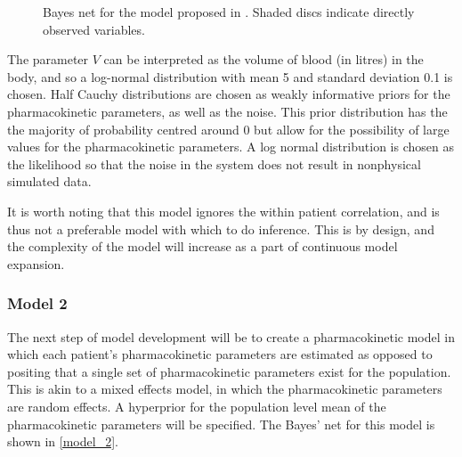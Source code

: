 \begin{figure}[t!]
	
	\centering
	\caption[Bayes net for first pharmacokinetic model]{Bayes net for the model proposed in .  Shaded discs indicate directly observed variables.}
	\label{model_1}
\end{figure}

The parameter $V$ can be interpreted as the volume of blood (in litres) in the body, and so a log-normal distribution with mean 5 and standard deviation 0.1 is chosen.  Half Cauchy distributions are chosen as weakly informative priors for the pharmacokinetic parameters, as well as the noise. This prior distribution has the the majority of probability centred around 0 but allow for the possibility of large values for the pharmacokinetic parameters.  A log normal distribution is chosen as the likelihood so that the noise in the system does not result in nonphysical simulated data.

It is worth noting that this model ignores the within patient correlation, and is thus not a preferable model with which to do inference.  This is by design, and the complexity of the model will increase as a part of continuous model expansion. 

\subsubsection{Model 2}

The next step of model development will be to create a  pharmacokinetic model in which each patient's pharmacokinetic parameters are estimated as opposed to positing that a single set of pharmacokinetic parameters exist for the population. This is akin to a mixed effects model, in which the pharmacokinetic parameters are random effects.  A hyperprior for the population level mean of the pharmacokinetic parameters will be specified.  The Bayes' net for this model is shown in \cref{model_2}.

